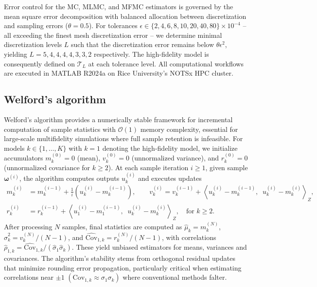 Error control for the MC, MLMC, and MFMC estimators is governed by the mean square error decomposition with balanced allocation between discretization and sampling errors ($\theta = 0.5$). For tolerances $\epsilon \in \{2,4,6,8,10,20,40,80\} \times 10^{-4}$ -- all exceeding the finest mesh discretization error -- we determine minimal discretization levels $L$ such that the discretization error remains below $\theta \epsilon^2$, yielding $L = 5,4,4,4,4,3,3,2 $ respectively. The high-fidelity model is consequently defined on $\mathcal{T}_L$ at each tolerance level. All computational workflows are executed in MATLAB R2024a on Rice University's NOTSx HPC cluster.






\subsection{Welford's algorithm}
Welford's algorithm \cite{Welford:1962} provides a numerically stable framework for incremental computation of sample statistics with $\mathcal{O}(1)$ memory complexity, essential for large-scale multifidelity simulations where full sample retention is infeasible. For models $k \in \{1, \dots, K\}$ with $k=1$ denoting the high-fidelity model, we initialize accumulators $m_k^{(0)} = 0$ (mean), $v_k^{(0)} = 0$ (unnormalized variance), and $r_k^{(0)} = 0$ (unnormalized covariance for $k \geq 2$). At each sample iteration $i \geq 1$, given sample $\boldsymbol{\omega}^{(i)}$, the algorithm computes outputs $u_k^{(i)}$ and executes updates
%
\begin{align*}
    m_k^{(i)} &= m_k^{(i-1)} + \frac{1}{i}\left( u_{k}^{(i)}-m_k^{(i-1)}\right),\qquad v_k^{(i)} = v_k^{(i-1)} + \left\langle  u_{k}^{(i)}-m_k^{(i-1)}, \;\; u_{k}^{(i)}-m_k^{(i)}\right\rangle_Z,\\
    r_k^{(i)} &= r_k^{(i-1)} + \left \langle  u_{1}^{(i)}-m_{1}^{(i-1)},\;\; u_{k}^{(i)}- m_{k}^{(i)}\right\rangle_Z, \quad \text{for }k\ge 2.
\end{align*}
%
After processing $N$ samples, final statistics are computed as $\widehat{\mu}_k = m_k^{(N)}$, $\widehat{\sigma}_k^2 = v_k^{(N)}/(N-1)$, and $\widehat{\text{Cov}}_{1,k} = r_k^{(N)}/(N-1)$, with correlations $\widehat{\rho}_{1,k} = \widehat{\text{Cov}}_{1,k}/(\widehat{\sigma}_1 \widehat{\sigma}_k)$. These yield unbiased estimators for means, variances and covariances. The algorithm's stability stems from orthogonal residual updates that minimize rounding error propagation, particularly critical when estimating correlations near $\pm 1$ $(\text{Cov}_{1,k}\approx \sigma_1\sigma_k)$ where conventional methods falter.

